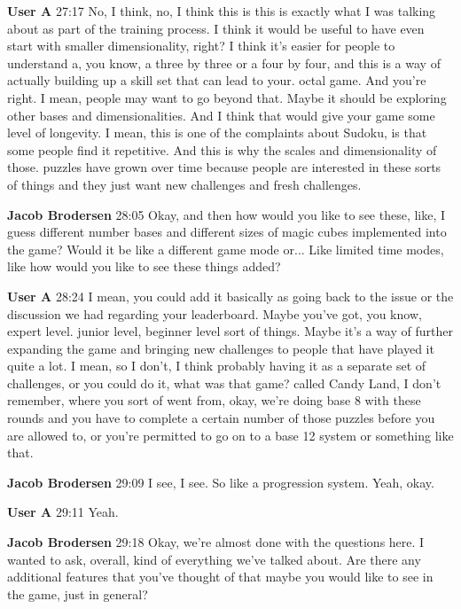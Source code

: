 \documentclass{article}
\begin{document}
\noindent \textbf{User A}   27:17
No, I think, no, I think this is this is exactly what I was talking about as part of the training process. I think it would be useful to have even start with smaller dimensionality, right? I think it's easier for people to understand a, you know, a three by three or a four by four, and this is a way of actually building up a skill set that can lead to your.
octal game. And you're right. I mean, people may want to go beyond that. Maybe it should be exploring other bases and dimensionalities. And I think that would give your game some level of longevity. I mean, this is one of the complaints about Sudoku, is that some people find it repetitive. And this is why the scales and dimensionality of those.
puzzles have grown over time because people are interested in these sorts of things and they just want new challenges and fresh challenges.

\noindent \textbf{Jacob Brodersen}   28:05
Okay, and then how would you like to see these, like, I guess different number bases and different sizes of magic cubes implemented into the game? Would it be like a different game mode or...
Like limited time modes, like how would you like to see these things added?

\noindent \textbf{User A}   28:24
I mean, you could add it basically as going back to the issue or the discussion we had regarding your leaderboard. Maybe you've got, you know, expert level.
junior level, beginner level sort of things. Maybe it's a way of further expanding the game and bringing new challenges to people that have played it quite a lot. I mean, so I don't, I think probably having it as a separate set of challenges, or you could do it, what was that game?
called Candy Land, I don't remember, where you sort of went from, okay, we're doing base 8 with these rounds and you have to complete a certain number of those puzzles before you are allowed to, or you're permitted to go on to a base 12 system or something like that.

\noindent \textbf{Jacob Brodersen}   29:09
I see, I see. So like a progression system. Yeah, okay.

\noindent \textbf{User A}   29:11
Yeah.

\noindent \textbf{Jacob Brodersen}   29:18
Okay, we're almost done with the questions here. I wanted to ask, overall, kind of everything we've talked about. Are there any additional features that you've thought of that maybe you would like to see in the game, just in general?
\end{document}
